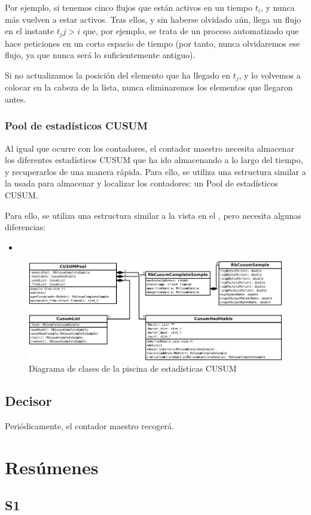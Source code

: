 Por ejemplo, si tenemos cinco flujos que están activos en un tiempo $t_i$, y nunca más vuelven a estar activos. Tras 
ellos, y sin haberse olvidado aún, llega un flujo en el instante $t_j j>i$ que, por ejemplo, se trata de un proceso 
automatizado que hace peticiones en un corto espacio de tiempo (por tanto, nunca olvidaremos ese flujo, ya que nunca 
será lo suficientemente antiguo).

Si no actualizamos la posición del elemento que ha llegado en $t_j$, y lo volvemos a colocar en la cabeza de la lista, 
nunca eliminaremos los elementos que llegaron antes.

\subsubsection{Pool de estadísticos CUSUM}

Al igual que ocurre con los contadores, el contador maestro necesita almacenar los diferentes estadísticos CUSUM que ha 
ido almacenando a lo largo del tiempo, y recuperarlos de una manera rápida. Para ello, se utiliza una estructura 
similar a la usada para almacenar y localizar los contadores: un Pool de estadísticos CUSUM.

Para ello, se utiliza una estructura similar a la vista en el , pero necesita algunas 
diferencias:
\begin{itemize}
 \item 
\end{itemize}


\begin{figure}[htbp]
\centering
\includegraphics[width=\textwidth]{CapituloEstructura/Figuras/DiagramaClasesCUSUM-crop}
\caption{Diagrama de clases de la piscina de estadísticas CUSUM}
\end{figure}
%

\subsection{Decisor}
Periódicamente, el contador maestro recogerá.


\section{Resúmenes}%
\begin{Resumen}
\subsection*{S1}
\end{Resumen}

